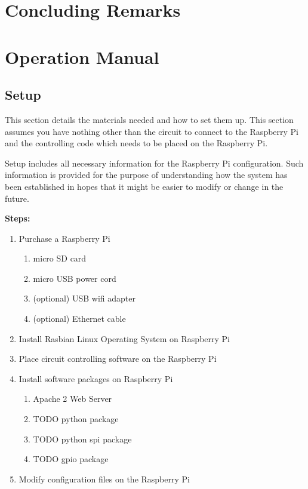 \documentclass{article}	%
\begin{document}
\begin{multicols}{2}

\section{Concluding Remarks}


\pagebreak
\appendix

\section{Operation Manual}
\subsection{Setup}
This section details the materials needed and
how to set them up.
This section assumes you have nothing
other than the
circuit to connect to the Raspberry Pi and
the controlling code which needs to be placed on
the Raspberry Pi.

Setup includes all necessary information
for the Raspberry Pi configuration.
Such information is provided
for the purpose of understanding 
how the system has been established
in hopes that it might be easier to modify or
change in the future.

\textbf{Steps:}
\begin{enumerate}
\item Purchase a Raspberry Pi
    \begin{enumerate}
    \item micro SD card
    \item micro USB power cord
    \item (optional) USB wifi adapter
    \item (optional) Ethernet cable
    \end{enumerate}
\item Install Rasbian Linux Operating System on Raspberry Pi
\item Place circuit controlling software on the Raspberry Pi
\item Install software packages on Raspberry Pi
    \begin{enumerate}
    \item Apache 2 Web Server
    \item TODO python package
    \item TODO python spi package
    \item TODO gpio package
    \end{enumerate}
\item Modify configuration files on the Raspberry Pi
\end{enumerate}


\end{multicols}
\end{document}
